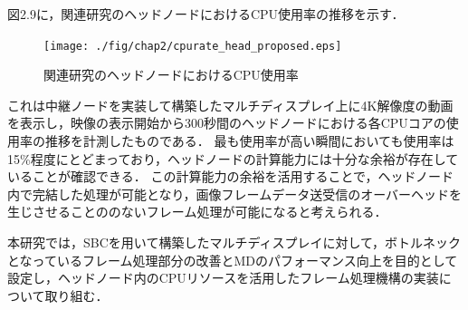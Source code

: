 図2.9に，関連研究のヘッドノードにおけるCPU使用率の推移を示す．

\begin{figure}[H]
  \hspace*{\fill}
  \texttt{[image: ./fig/chap2/cpurate\_head\_proposed.eps]}
  \hspace*{\fill}
  \caption{関連研究のヘッドノードにおけるCPU使用率}
 \end{figure}

これは中継ノードを実装して構築したマルチディスプレイ上に4K解像度の動画を表示し，映像の表示開始から300秒間のヘッドノードにおける各CPUコアの使用率の推移を計測したものである．
最も使用率が高い瞬間においても使用率は15\%程度にとどまっており，ヘッドノードの計算能力には十分な余裕が存在していることが確認できる．
この計算能力の余裕を活用することで，ヘッドノード内で完結した処理が可能となり，画像フレームデータ送受信のオーバーヘッドを生じさせることののないフレーム処理が可能になると考えられる．

本研究では，SBCを用いて構築したマルチディスプレイに対して，ボトルネックとなっているフレーム処理部分の改善とMDのパフォーマンス向上を目的として設定し，ヘッドノード内のCPUリソースを活用したフレーム処理機構の実装について取り組む．


